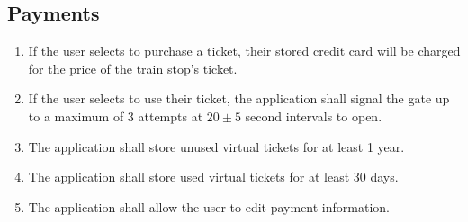 	\subsection{Payments}\begin{frame}\begin{enumerate}
		\item If the user selects to purchase a ticket, their stored credit card will be charged for the price of the train stop’s ticket.
		\item If the user selects to use their ticket, the application shall signal the gate up to a maximum of 3 attempts at $20\pm 5$ second intervals to open.
		\item The application shall store unused virtual tickets for at least 1 year.
		\item The application shall store used virtual tickets for at least 30 days.
		\item The application shall allow the user to edit payment information.
	\end{enumerate}\end{frame}		
\newpage	
